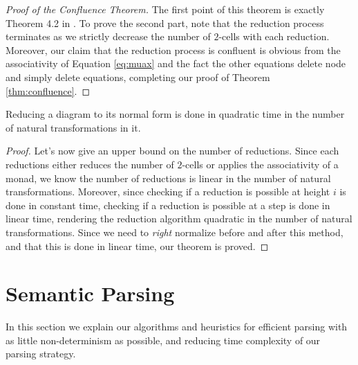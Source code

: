 \documentclass[math, english, info]{cours}
\begin{document}
\begin{proof}[Proof of the Confluence Theorem]
	The first point of this theorem is exactly Theorem 4.2
	in .
	To prove the second part, note that the reduction process terminates as
	we strictly decrease the number of $2$-cells with each reduction.
	Moreover, our claim that the reduction process is confluent is obvious
	from the associativity of Equation \eqref{eq:muax} and the fact the other
	equations delete node and simply delete equations, completing our proof
	of Theorem \ref{thm:confluence}.
\end{proof}


\begin{thm}
	Reducing a diagram to its normal form is done in quadratic time in
	the number of natural transformations in it.
\end{thm}
\begin{proof}
	Let's now give an upper bound on the number of reductions.
	Since each reductions either reduces the number of $2$-cells or applies the
	associativity of a monad, we know the number of reductions is linear in the
	number of natural transformations.
	Moreover, since checking if a reduction is possible at height $i$ is done in
	constant time, checking if a reduction is possible at a step is done in
	linear time, rendering the reduction algorithm quadratic in the number of
	natural transformations.
	Since we need to \emph{right} normalize before and after this method, and
	that this is done in linear time, our theorem is proved.
\end{proof}

\section{Semantic Parsing}\label{sec:parsing}
In this section we explain our algorithms and heuristics for efficient parsing with as little non-determinism as possible, and reducing time complexity of our parsing strategy.
\end{document}
